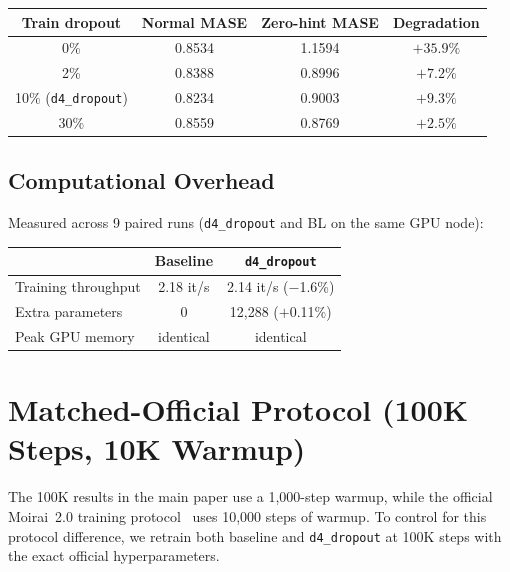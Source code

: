 \documentclass{article}
\begin{document}
\begin{table}[H]
\centering
\small
\begin{tabular}{cccc}
\toprule
\textbf{Train dropout} & \textbf{Normal MASE} & \textbf{Zero-hint MASE} & \textbf{Degradation} \\
\midrule
0\% & 0.8534 & 1.1594 & $+35.9\%$ \\
2\% & 0.8388 & 0.8996 & $+7.2\%$ \\
10\% (\texttt{d4\_dropout}) & 0.8234 & 0.9003 & $+9.3\%$ \\
30\% & 0.8559 & 0.8769 & $+2.5\%$ \\
\bottomrule
\end{tabular}
\end{table}

\subsection{Computational Overhead}

Measured across 9 paired runs (\texttt{d4\_dropout} and BL on the same GPU node):

\begin{table}[H]
\centering
\small
\begin{tabular}{lcc}
\toprule
& \textbf{Baseline} & \textbf{\texttt{d4\_dropout}} \\
\midrule
Training throughput & 2.18 it/s & 2.14 it/s ($-$1.6\%) \\
Extra parameters & 0 & 12,288 ($+$0.11\%) \\
Peak GPU memory & identical & identical \\
\bottomrule
\end{tabular}
\end{table}

\section{Matched-Official Protocol (100K Steps, 10K Warmup)}
\label{app:matched_official}

The 100K results in the main paper use a 1,000-step warmup, while the official Moirai~2.0 training protocol~\citep{liu2024moirai2} uses 10,000 steps of warmup. To control for this protocol difference, we retrain both baseline and \texttt{d4\_dropout} at 100K steps with the exact official hyperparameters.
\end{document}
